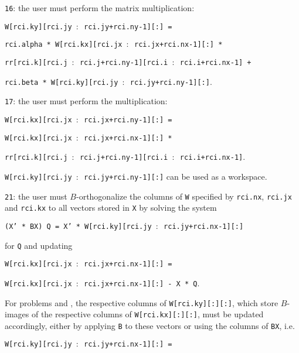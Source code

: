 \begin{description}
\begin{description}
%
\item
{\tt 16}: the user must perform the matrix multiplication:

\hspace{8mm}
{\tt W[rci.ky][rci.jy $:$ rci.jy+rci.ny-1][:] =}

\hspace{12mm}
{\tt rci.alpha *
W[rci.kx][rci.jx $:$ rci.jx+rci.nx-1][:] *}

\hspace{16mm}
{\tt rr[rci.k][rci.j $:$ rci.j+rci.ny-1][rci.i $:$ rci.i+rci.nx-1] + }

\hspace{12mm}
{\tt rci.beta * W[rci.ky][rci.jy $:$ rci.jy+rci.ny-1][:]}.
%
\item
{\tt 17}: the user must perform the multiplication:


\hspace{8mm}
{\tt W[rci.kx][rci.jx $:$ rci.jx+rci.ny-1][:] =}

\hspace{12mm}
{\tt W[rci.kx][rci.jx $:$ rci.jx+rci.nx-1][:] *}

\hspace{16mm}
{\tt rr[rci.k][rci.j $:$ rci.j+rci.ny-1][rci.i $:$ rci.i+rci.nx-1]}.

{\tt W[rci.ky][rci.jy $:$ rci.jy+rci.ny-1][:]}
can be used as a workspace.
%
\item
{\tt 21}: 
the user must $B$-orthogonalize
the columns of {\tt W} specified by
{\tt rci.nx}, {\tt rci.jx} and {\tt rci.kx} 
to all vectors stored in {\tt X}
by solving the system

\hspace{8mm}
{\tt (X' * BX) Q = X' * W[rci.ky][rci.jy $:$ rci.jy+rci.nx-1][:]}

for {\tt Q} and updating

\hspace{8mm}
{\tt W[rci.kx][rci.jx $:$ rci.jx+rci.nx-1][:] =}

\hspace{12mm}
{\tt W[rci.kx][rci.jx $:$ rci.jx+rci.nx-1][:] - X * Q}.

For problems  and ,
the respective columns of {\tt W[rci.ky][:][:]},
which store $B$-images of the respective columns of {\tt W[rci.kx][:][:]},
must be updated
accordingly, either by applying {\tt B} to these vectors
or using the columns of {\tt BX}, i.e.

\hspace{8mm}
{\tt W[rci.ky][rci.jy $:$ rci.jy+rci.nx-1][:] =}


\end{description}
\end{description}
